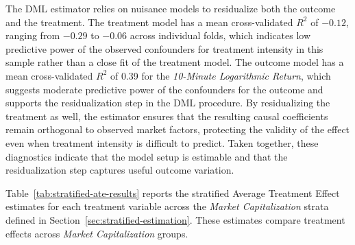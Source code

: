 The DML estimator relies on nuisance models to residualize both the outcome and the treatment. The treatment model has a mean cross-validated $R^2$ of $-0.12$, ranging from $-0.29$ to $-0.06$ across individual folds, which indicates low predictive power of the observed confounders for treatment intensity in this sample rather than a close fit of the treatment model. The outcome model has a mean cross-validated $R^2$ of 0.39 for the \textit{10-Minute Logarithmic Return}, which suggests moderate predictive power of the confounders for the outcome and supports the residualization step in the DML procedure. By residualizing the treatment as well, the estimator ensures that the resulting causal coefficients remain orthogonal to observed market factors, protecting the validity of the effect even when treatment intensity is difficult to predict. Taken together, these diagnostics indicate that the model setup is estimable and that the residualization step captures useful outcome variation.

Table~\ref{tab:stratified-ate-results} reports the stratified Average Treatment Effect estimates for each treatment variable across the \textit{Market Capitalization} strata defined in Section~\ref{sec:stratified-estimation}. These estimates compare treatment effects across \textit{Market Capitalization} groups.

